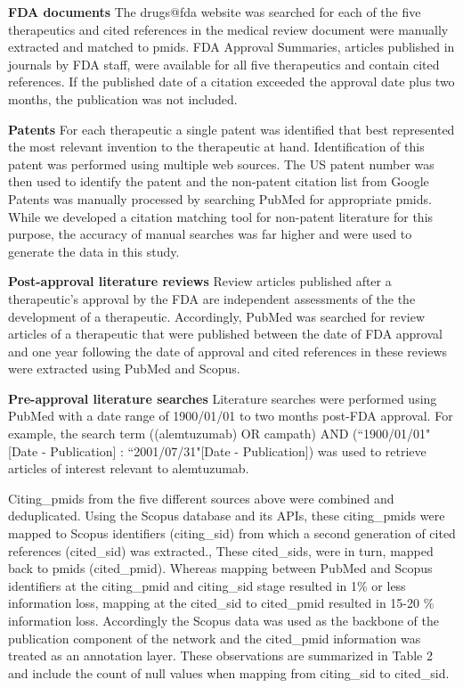 \documentclass[10pt,letterpaper]{article}
\begin{document}
\textbf{FDA documents} The drugs@fda website\cite{bib6} was searched for each of the five therapeutics and cited references in the medical review document were manually extracted and matched to pmids. FDA Approval Summaries, articles published in journals by FDA staff, were available for all five therapeutics and contain cited references. If the published date of a citation exceeded the approval date plus two months, the publication was not included.

\textbf{Patents} For each therapeutic a single patent was identified that best represented the most relevant invention to the therapeutic at hand. Identification of this patent was performed using multiple web sources. The US patent number was then used to identify the patent and the non-patent citation list from Google Patents \cite{bib8} was manually processed by searching PubMed for appropriate pmids. While we developed a citation matching tool for non-patent literature for this purpose, the accuracy of manual searches was far higher and were used to generate the data in this study.

\textbf{Post-approval literature reviews} Review articles published after a therapeutic's approval by the FDA are independent assessments of the the development of a therapeutic. Accordingly, PubMed was searched for review articles of a therapeutic that were published between the date of FDA approval and one year following the date of approval and cited references in these reviews were extracted using PubMed and Scopus.

\textbf{Pre-approval literature searches} Literature searches were performed using PubMed with a date range of 1900/01/01 to two months post-FDA approval. For example, the search term ((alemtuzumab) OR campath) AND (``1900/01/01"[Date - Publication] : ``2001/07/31"[Date - Publication]) was used to retrieve articles of interest relevant to alemtuzumab.

Citing\_pmids from the five different sources above  were combined and deduplicated. Using the Scopus database and its APIs, these citing\_pmids were mapped to Scopus identifiers (citing\_sid) from which a second generation of cited references (cited\_sid) was extracted., These cited\_sids, were in turn, mapped back to pmids (cited\_pmid). Whereas mapping between PubMed and Scopus identifiers at the citing\_pmid and citing\_sid stage resulted in 1\% or less information loss, mapping at the cited\_sid to cited\_pmid resulted in 15-20 \% information loss. Accordingly the Scopus data  was used as the backbone of the publication component of the network and the cited\_pmid information was treated as an annotation layer.  These observations are summarized in Table 2 and include the count of null values when mapping from citing\_sid to cited\_sid.
\end{document}
